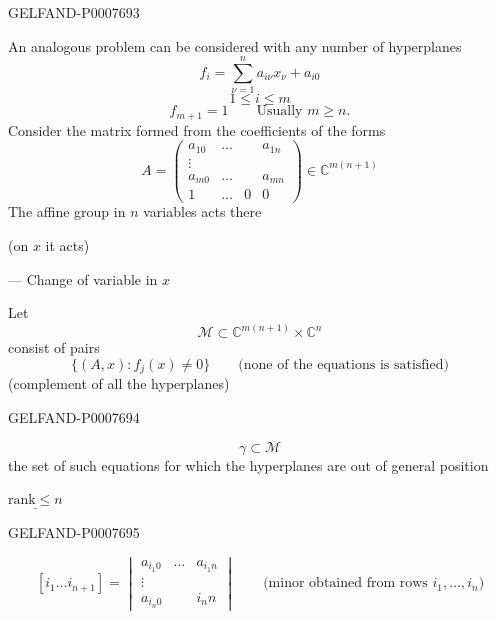 \begin{GelfandAdjacentEvidence}{GELFAND-P000769}{3}

An analogous problem can be considered with any number of hyperplanes
\begin{equation*}
\tag{4}
f_i=\sum_{\nu=1}^{n}a_{i\nu}x_\nu+a_{i0}
\end{equation*}
\[
1\le i\le m
\]
\[
f_{m+1}=1\qquad\text{Usually }m\ge n.
\]
Consider the matrix formed from the coefficients of the forms
\begin{equation*}
\tag{5}
A=\begin{pmatrix}
a_{10}&\ldots&&a_{1n}\\
\vdots&&&\\
a_{m0}&\ldots&&a_{mn}\\
1&\ldots&0&0
\end{pmatrix}
\in\mathbb C^{m(n+1)}
\end{equation*}
The affine group in \(n\) variables acts there

(on \(x\) it acts)

--- Change of variable in \(x\)

Let
\[
\mathcal M\subset\mathbb C^{m(n+1)}\times\mathbb C^n
\]
consist of pairs
\[
\{(A,x):f_j(x)\ne0\}\qquad\text{(none of the equations is satisfied)}
\]
(complement of all the hyperplanes)

\end{GelfandAdjacentEvidence}
\begin{GelfandAdjacentEvidence}{GELFAND-P000769}{4}


\[
\gamma\subset\mathcal M
\]
the set of such equations for which the hyperplanes are out of general position

\(\underline{\text{rank}\le n}\)
\end{GelfandAdjacentEvidence}
\begin{GelfandAdjacentEvidence}{GELFAND-P000769}{5}


\[
[i_1\ldots i_{n+1}]=
\begin{vmatrix}
a_{i_1 0}&\ldots&a_{i_1 n}\\
\vdots&&\\
a_{i_n 0}&&i_n n
\end{vmatrix}
\qquad\text{(minor obtained from rows }i_1,\ldots,i_n\text{)}
\]
\end{GelfandAdjacentEvidence}
